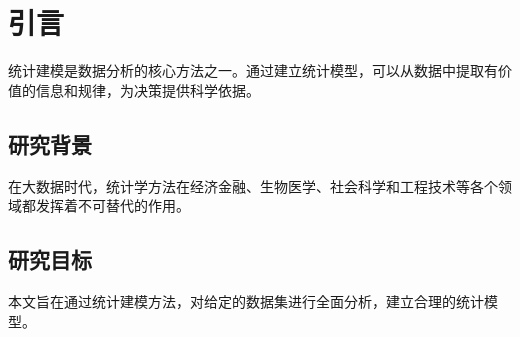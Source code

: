 \section{引言}

统计建模是数据分析的核心方法之一。通过建立统计模型，可以从数据中提取有价值的信息和规律，为决策提供科学依据。

\subsection{研究背景}

在大数据时代，统计学方法在经济金融、生物医学、社会科学和工程技术等各个领域都发挥着不可替代的作用。

\subsection{研究目标}

本文旨在通过统计建模方法，对给定的数据集进行全面分析，建立合理的统计模型。
